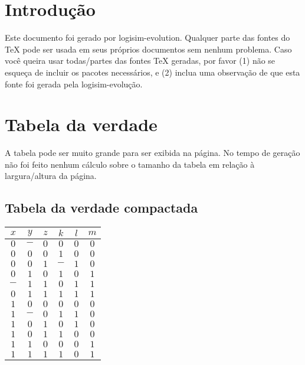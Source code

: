 \documentclass [15pt,a4paper,twoside]{article}
\begin{document}
\section{Introdução}
Este documento foi gerado por logisim-evolution. Qualquer parte das fontes do TeX pode ser usada em seus próprios documentos sem nenhum problema. Caso você queira usar todas/partes das fontes TeX geradas, por favor (1) não se esqueça de incluir os pacotes necessários, e (2) inclua uma observação de que esta fonte foi gerada pela logisim-evolução.
\section{Tabela da verdade}
A tabela pode ser muito grande para ser exibida na página. No tempo de geração não foi feito nenhum cálculo sobre o tamanho da tabela em relação à largura/altura da página.
\subsection{Tabela da verdade compactada}
\begin{center}
\begin{tabular}{cccc|cc}
$x$&$y$&$z$&$k$&$l$&$m$\\
\hline
$0$&$-$&$0$&$0$&$0$&$0$\\
$0$&$0$&$0$&$1$&$0$&$0$\\
$0$&$0$&$1$&$-$&$1$&$0$\\
$0$&$1$&$0$&$1$&$0$&$1$\\
$-$&$1$&$1$&$0$&$1$&$1$\\
$0$&$1$&$1$&$1$&$1$&$1$\\
$1$&$0$&$0$&$0$&$0$&$0$\\
$1$&$-$&$0$&$1$&$1$&$0$\\
$1$&$0$&$1$&$0$&$1$&$0$\\
$1$&$0$&$1$&$1$&$0$&$0$\\
$1$&$1$&$0$&$0$&$0$&$1$\\
$1$&$1$&$1$&$1$&$0$&$1$\\

\end{tabular}
\end{center}
\end{document}
